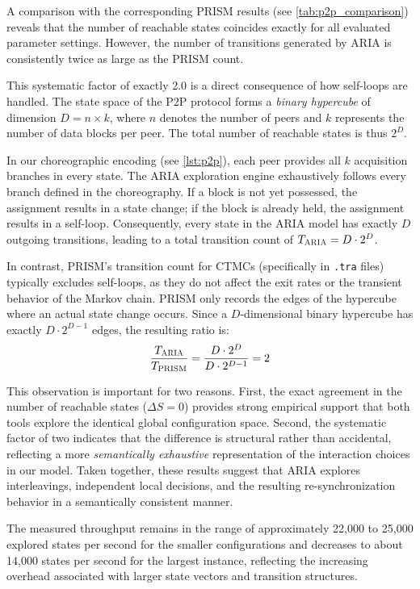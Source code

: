 A comparison with the corresponding PRISM results (see \cref{tab:p2p_comparison}) reveals that the number of reachable states coincides exactly for all evaluated parameter settings. However, the number of transitions generated by \textsc{ARIA} is consistently twice as large as the PRISM count.

This systematic factor of exactly 2.0 is a direct consequence of how self-loops are handled. The state space of the P2P protocol forms a \textit{binary hypercube} of dimension $D = n \times k$, where $n$ denotes the number of peers and $k$ represents the number of data blocks per peer. The total number of reachable states is thus $2^D$. 

In our choreographic encoding (see \cref{lst:p2p}), each peer provides all $k$ acquisition branches in every state. The \textsc{ARIA} exploration engine exhaustively follows every branch defined in the choreography. If a block is not yet possessed, the assignment results in a state change; if the block is already held, the assignment results in a self-loop. Consequently, every state in the \textsc{ARIA} model has exactly $D$ outgoing transitions, leading to a total transition count of $T_{\textsc{ARIA}} = D \cdot 2^D$.

In contrast, PRISM's transition count for CTMCs (specifically in \texttt{.tra} files) typically excludes self-loops, as they do not affect the exit rates or the transient behavior of the Markov chain. PRISM only records the edges of the hypercube where an actual state change occurs. Since a $D$-dimensional binary hypercube has exactly $D \cdot 2^{D-1}$ edges, the resulting ratio is:
\begin{equation}
	\frac{T_{\textsc{ARIA}}}{T_{\text{PRISM}}} = \frac{D \cdot 2^D}{D \cdot 2^{D-1}} = 2
\end{equation}

This observation is important for two reasons. First, the exact agreement in the number of reachable states ($\Delta S = 0$) provides strong empirical support that both tools explore the identical global configuration space. Second, the systematic factor of two indicates that the difference is structural rather than accidental, reflecting a more \textit{semantically exhaustive} representation of the interaction choices in our model. Taken together, these results suggest that \textsc{ARIA} explores interleavings, independent local decisions, and the resulting re-synchronization behavior in a semantically consistent manner.

The measured throughput remains in the range of approximately 22{,}000 to 25{,}000 explored states per second for the smaller configurations and decreases to about 14{,}000 states per second for the largest instance, reflecting the increasing overhead associated with larger state vectors and transition structures.

